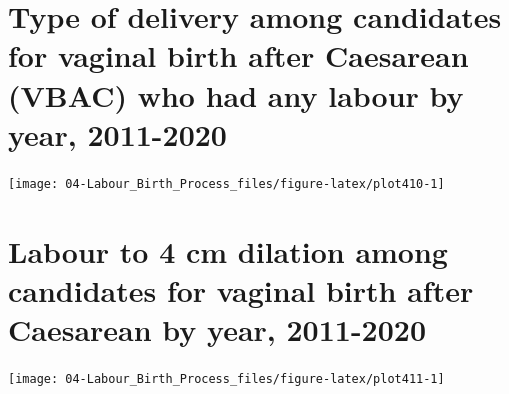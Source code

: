 \documentclass[
]{krantz}
\begin{document}
\hypertarget{section-410}{%
\section{Type of delivery among candidates for vaginal birth after Caesarean (VBAC) who had any labour by year, 2011-2020}\label{section-410}}

\begin{center}\texttt{[image: 04-Labour\_Birth\_Process\_files/figure-latex/plot410-1]} \end{center}

\begin{table}[H]
\centering
{}
\end{table}

\hypertarget{section-411}{%
\section{Labour to 4 cm dilation among candidates for vaginal birth after Caesarean by year, 2011-2020}\label{section-411}}

\begin{center}\texttt{[image: 04-Labour\_Birth\_Process\_files/figure-latex/plot411-1]} \end{center}
\end{document}

